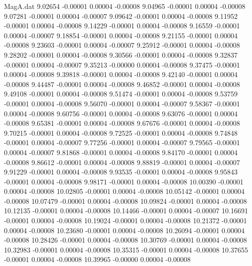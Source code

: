 \begin{filecontents}{MagA.dat}
   9.02654   -0.00001    0.00004   -0.00008
   9.04965   -0.00001    0.00004   -0.00008
   9.07281   -0.00001    0.00004   -0.00007
   9.09642   -0.00001    0.00004   -0.00008
   9.11952   -0.00001    0.00004   -0.00008
   9.14229   -0.00001    0.00004   -0.00008
   9.16559   -0.00001    0.00004   -0.00007
   9.18854   -0.00001    0.00004   -0.00008
   9.21155   -0.00001    0.00004   -0.00008
   9.23603   -0.00001    0.00004   -0.00007
   9.25912   -0.00001    0.00004   -0.00008
   9.28202   -0.00001    0.00004   -0.00008
   9.30566   -0.00001    0.00004   -0.00008
   9.32837   -0.00001    0.00004   -0.00007
   9.35213   -0.00000    0.00004   -0.00008
   9.37475   -0.00001    0.00004   -0.00008
   9.39818   -0.00001    0.00004   -0.00008
   9.42140   -0.00001    0.00004   -0.00008
   9.44487   -0.00001    0.00004   -0.00008
   9.46852   -0.00001    0.00004   -0.00008
   9.49108   -0.00001    0.00004   -0.00008
   9.51474   -0.00001    0.00004   -0.00008
   9.53759   -0.00001    0.00004   -0.00008
   9.56070   -0.00001    0.00004   -0.00007
   9.58367   -0.00001    0.00004   -0.00008
   9.60756   -0.00001    0.00004   -0.00008
   9.63076   -0.00001    0.00004   -0.00008
   9.65381   -0.00001    0.00004   -0.00008
   9.67676   -0.00001    0.00004   -0.00008
   9.70215   -0.00001    0.00004   -0.00008
   9.72525   -0.00001    0.00004   -0.00008
   9.74848   -0.00001    0.00004   -0.00007
   9.77256   -0.00001    0.00004   -0.00007
   9.79565   -0.00001    0.00004   -0.00007
   9.81868   -0.00001    0.00004   -0.00008
   9.84170   -0.00001    0.00004   -0.00008
   9.86612   -0.00001    0.00004   -0.00008
   9.88819   -0.00001    0.00004   -0.00007
   9.91229   -0.00001    0.00004   -0.00008
   9.93535   -0.00001    0.00004   -0.00008
   9.95843   -0.00001    0.00004   -0.00008
   9.98171   -0.00001    0.00004   -0.00008
  10.00390   -0.00001    0.00004   -0.00008
  10.02805   -0.00001    0.00004   -0.00008
  10.05142   -0.00001    0.00004   -0.00008
  10.07479   -0.00001    0.00004   -0.00008
  10.09824   -0.00001    0.00004   -0.00008
  10.12135   -0.00001    0.00004   -0.00008
  10.14466   -0.00001    0.00004   -0.00007
  10.16691   -0.00001    0.00004   -0.00008
  10.19024   -0.00001    0.00004   -0.00008
  10.21372   -0.00001    0.00004   -0.00008
  10.23680   -0.00001    0.00004   -0.00008
  10.26094   -0.00001    0.00004   -0.00008
  10.28426   -0.00001    0.00004   -0.00008
  10.30769   -0.00001    0.00004   -0.00008
  10.32983   -0.00001    0.00004   -0.00008
  10.35315   -0.00001    0.00004   -0.00008
  10.37655   -0.00001    0.00004   -0.00008
  10.39965   -0.00000    0.00004   -0.00008

\end{filecontents}
